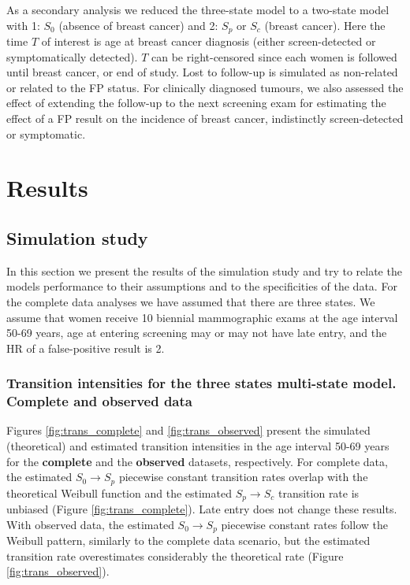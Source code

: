 \documentclass{bmcart}
\begin{document}
As a secondary analysis we reduced the three-state model to a two-state model with 1: $S_0$
(absence of breast cancer) and 2: $S_p$ or $S_c$ (breast cancer). Here the time $T$ of interest is
age at breast cancer diagnosis (either screen-detected or symptomatically detected). $T$ can be
right-censored since each women is followed until breast cancer, or end of study. Lost to follow-up
is simulated as non-related or related to the FP status. For clinically diagnosed
tumours, we also assessed the effect of extending the follow-up to the next screening exam for
estimating the effect of a FP result on the incidence of breast cancer, indistinctly
screen-detected or symptomatic.

\section*{Results}
\subsection*{Simulation study}
In this section we present the results of the simulation study and try to relate the models
performance to their assumptions and to the specificities of the data. For the complete data
analyses we have assumed that there are three states. We assume that women receive 10 biennial
mammographic exams at the age interval 50-69 years, age at entering screening may or may not have
late entry, and the HR of a false-positive result is 2.

\subsubsection*{Transition intensities for the three states multi-state model. Complete and observed
                data}
Figures \ref{fig:trans_complete} and \ref{fig:trans_observed} present the simulated (theoretical)
and estimated transition intensities in the age interval 50-69 years for the \textbf{complete} and
the \textbf{observed} datasets, respectively. For complete data, the estimated
$S_0 \rightarrow S_p$ piecewise constant transition rates overlap with the theoretical Weibull
function and the estimated $S_p \rightarrow S_c$ transition rate is unbiased (Figure
\ref{fig:trans_complete}). Late entry does not change these results. With observed data, the
estimated $S_0 \rightarrow S_p$ piecewise constant rates follow the Weibull pattern, similarly to
the complete data scenario, but the estimated transition rate overestimates considerably the
theoretical rate (Figure \ref{fig:trans_observed}).
\end{document}
